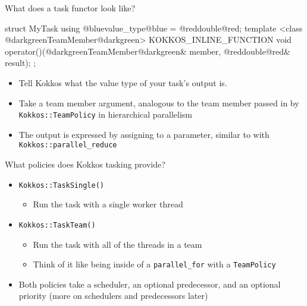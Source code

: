 
\begin{frame}[fragile]{What does a task functor look like?}

  \begin{code}[linebackgroundcolor={},keywords={}]
struct MyTask {
  using @bluevalue_type@blue = @reddouble@red;
  template <class @darkgreenTeamMember@darkgreen>
  KOKKOS_INLINE_FUNCTION
  void operator()(@darkgreenTeamMember@darkgreen& member, @reddouble@red& result);
};
  \end{code}
  
  \begin{itemize}
    \item Tell Kokkos what the {\color{blue}value type} of your task's output is.
    \item Take a {\color{darkgreen}team member} argument, analogous to the team member passed in by \texttt{Kokkos::TeamPolicy} in hierarchical parallelism
    \item The {\color{red} output} is expressed by assigning to a parameter, similar to with \texttt{Kokkos::parallel\_reduce}
  \end{itemize}

\end{frame}


\begin{frame}[fragile]{What policies does Kokkos tasking provide?}

  \begin{itemize}
    \item \texttt{Kokkos::TaskSingle()}
      \begin{itemize}
        \item Run the task with a single worker thread
      \end{itemize}
    \item \texttt{Kokkos::TaskTeam()}
      \begin{itemize}
        \item Run the task with all of the threads in a team
        \item Think of it like being inside of a \texttt{parallel\_for} with a \texttt{TeamPolicy}
      \end{itemize}
    \item Both policies take a scheduler, an optional predecessor, and an optional priority (more on schedulers and predecessors later)
  \end{itemize}

\end{frame}

